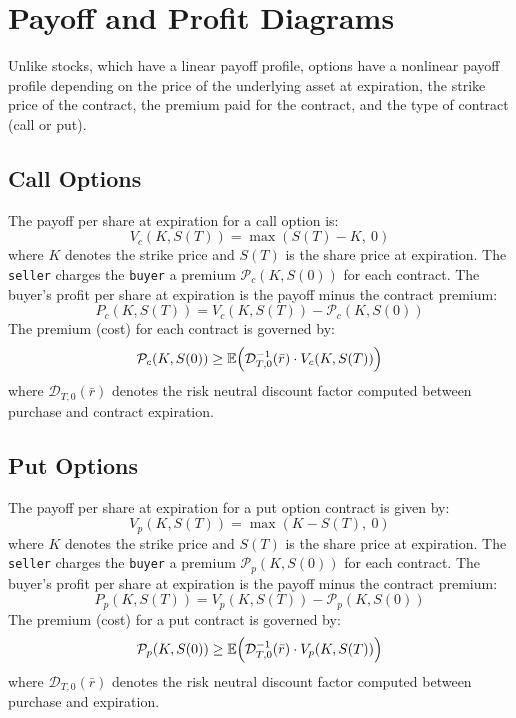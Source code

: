 \documentclass[11pt]{article}
\theoremstyle{definition}
\begin{document}
\section*{Payoff and Profit Diagrams}
Unlike stocks, which have a linear payoff profile, options have a nonlinear payoff profile depending on the price of the underlying asset at expiration, 
the strike price of the contract, the premium paid for the contract, and the type of contract (call or put).

\subsection*{Call Options}
The payoff per share at expiration for a call option is:
\begin{equation*}
V_{c}(K,S(T)) = \max\left(S(T) - K,~0\right)
\end{equation*}
where $K$ denotes the strike price and $S(T)$ is the share price at expiration. 
The \texttt{seller} charges the \texttt{buyer} a premium $\mathcal{P}_{c}(K,S(0))$ for each contract.
The buyer's profit per share at expiration is the payoff minus the contract premium:
\begin{equation*}
P_{c}(K,S(T)) = V_{c}(K,S(T)) -  \mathcal{P}_{c}(K,S(0))
\end{equation*}
The premium (cost) for each contract is governed by:
\begin{equation*}
\mathcal{P}_{c}(K,S(0))\geq\mathbb{E}\Bigl(\mathcal{D}^{-1}_{T,0}(\bar{r})\cdot{V_{c}}(K,S(T))\Bigr)
\end{equation*}
where $\mathcal{D}_{T,0}(\bar{r})$ denotes the risk neutral discount factor computed between purchase and contract expiration.

\subsection*{Put Options}
The payoff per share at expiration for a put option contract is given by:
\begin{equation*}
V_{p}(K,S(T)) = \max\left(K - S(T),~0\right)
\end{equation*}
where $K$ denotes the strike price and $S(T)$ is the share price at expiration. 
The \texttt{seller} charges the \texttt{buyer} a premium $\mathcal{P}_{p}(K,S(0))$ for each contract.
The buyer's profit per share at expiration is the payoff minus the contract premium:
\begin{equation*}
P_{p}(K,S(T)) = V_{p}(K,S(T)) -  \mathcal{P}_{p}(K,S(0))
\end{equation*}
The premium (cost) for a put contract is governed by:
\begin{equation*}
\mathcal{P}_{p}(K,S(0))\geq\mathbb{E}\Bigl(\mathcal{D}^{-1}_{T,0}(\bar{r})\cdot{V_{p}}(K,S(T))\Bigr)
\end{equation*}
where $\mathcal{D}_{T,0}(\bar{r})$ denotes the risk neutral discount factor computed between purchase and expiration.
\end{document}
